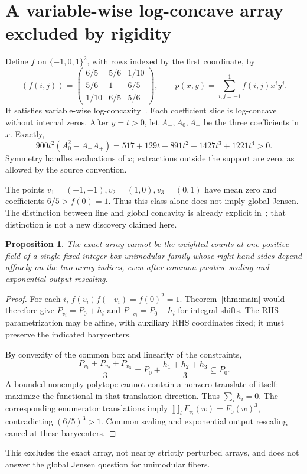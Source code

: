 \documentclass[11pt]{article}
\newtheorem{proposition}[theorem]{Proposition}
\begin{document}
\section{A variable-wise log-concave array excluded by rigidity}
Define \(f\) on \(\{-1,0,1\}^2\), with rows indexed by the first coordinate, by
\[
(f(i,j))=
\begin{pmatrix}6/5&5/6&1/10\\5/6&1&6/5\\1/10&6/5&5/6\end{pmatrix},
\qquad p(x,y)=\sum_{i,j=-1}^1f(i,j)x^iy^j.
\]
It satisfies variable-wise log-concavity~\cite[Definition 2.1]{LMY}.
Each coefficient slice is log-concave without internal zeros. After \(y=t>0\), let \(A_-,A_0,A_+\) be the three coefficients in \(x\). Exactly,
\[
900t^2(A_0^2-A_-A_+)=517+129t+891t^2+1427t^3+1221t^4>0.
\]
Symmetry handles evaluations of \(x\); extractions outside the support are zero, as allowed by the source convention.

The points \(v_1=(-1,-1),v_2=(1,0),v_3=(0,1)\) have mean zero and coefficients \(6/5>f(0)=1\). Thus this class alone does not imply global Jensen. The distinction between line and global concavity is already explicit in~\cite{LMY}; that distinction is not a new discovery claimed here.

\begin{proposition}\label{prop:obstruction}
The exact array cannot be the weighted counts at one positive field of a single fixed integer-box unimodular family whose right-hand sides depend affinely on the two array indices, even after common positive scaling and exponential output rescaling.
\end{proposition}
\begin{proof}
For each \(i\), \(f(v_i)f(-v_i)=f(0)^2=1\).
Theorem~\ref{thm:main} would therefore give
\(P_{v_i}=P_0+h_i\) and \(P_{-v_i}=P_0-h_i\) for integral shifts.
The RHS parametrization may be affine, with auxiliary RHS coordinates fixed; it must preserve the indicated barycenters.

By convexity of the common box and linearity of the constraints,
\[
\frac{P_{v_1}+P_{v_2}+P_{v_3}}3
=P_0+\frac{h_1+h_2+h_3}3\subseteq P_0.
\]
A bounded nonempty polytope cannot contain a nonzero translate of itself: maximize the functional in that translation direction. Thus \(\sum_i h_i=0\).
The corresponding enumerator translations imply \(\prod_i F_{v_i}(w)=F_0(w)^3\), contradicting \((6/5)^3>1\). Common scaling and exponential output rescaling cancel at these barycenters.
\end{proof}
This excludes the exact array, not nearby strictly perturbed arrays, and does not answer the global Jensen question for unimodular fibers.
\end{document}
